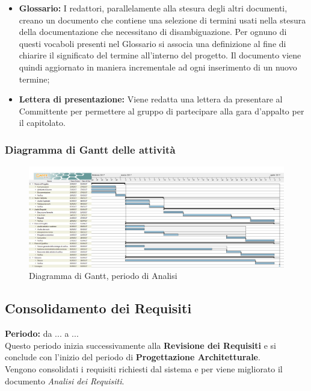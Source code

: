 \begin{itemize}
		\item \textbf{Glossario:} I redattori, parallelamente alla stesura degli altri documenti, creano un documento che contiene una selezione di termini usati nella stesura della documentazione che necessitano di disambiguazione. Per ognuno di questi vocaboli presenti nel Glossario si associa una definizione al fine di chiarire il significato del termine all'interno del progetto. Il documento viene quindi aggiornato in maniera incrementale ad ogni inserimento di un nuovo termine; \\
		\item \textbf{Lettera di presentazione:} Viene redatta una lettera da presentare al Committente per permettere al gruppo di partecipare alla gara d'appalto per il capitolato. \\
	\end{itemize}
	\subsubsection{Diagramma di Gantt delle attività}
	\begin{figure}[H]
		\centering
		\includegraphics[width=1\linewidth]{immagini/gantt/analisi.png}
		\caption{Diagramma di Gantt, periodo di Analisi}
	\end{figure}
	\subsection{Consolidamento dei Requisiti}
	\textbf{Periodo:} da ... a ... \\
	Questo periodo inizia successivamente alla \textbf{Revisione dei Requisiti} e si conclude con l'inizio del periodo di \textbf{Progettazione Architetturale}. \\
	Vengono consolidati i requisiti richiesti dal sistema e per viene migliorato il documento \textit{Analisi dei Requisiti}. \\
